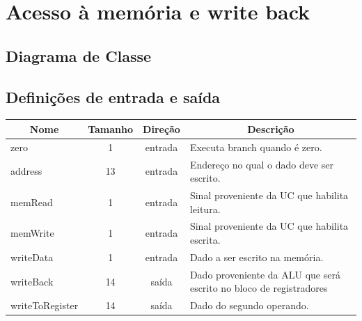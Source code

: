 \section{Acesso à memória e write back}
	\subsection{Diagrama de Classe}
  \begin{figure}[H]
    
  \end{figure}

\subsection{Definições de entrada e saída}

	\begin{center}
        \begin{longtable}[pos]{| l | c | c | m{7cm} |} \hline
          \multicolumn{1}{|c|}{\cellcolor[gray]{0.9}\textbf{Nome}} & 
          \multicolumn{1}{c|}{\cellcolor[gray]{0.9}\textbf{Tamanho}} & 
          \multicolumn{1}{c|}{\cellcolor[gray]{0.9}\textbf{Direção}} &
          \multicolumn{1}{c|}{\cellcolor[gray]{0.9}\textbf{Descrição}} \\ \hline
          \endhead
          \hline
          \endlastfoot

          zero          	       & 1   & entrada   & Executa branch quando é zero.    \\ \hline
          address                  & 13  & entrada   & Endereço no qual o dado deve ser escrito.    \\ \hline
          memRead                  & 1   & entrada   & Sinal proveniente da UC que habilita leitura.    \\ \hline
          memWrite                 & 1   & entrada   & Sinal proveniente da UC que habilita escrita.    \\ \hline
          writeData      		   & 1   & entrada   & Dado a ser escrito na memória. \\ \hline
          writeBack	               & 14  & saída     & Dado proveniente da ALU que será escrito no bloco de registradores\\ \hline
          writeToRegister          & 14  & saída     & Dado do segundo operando.    \\
        \end{longtable}
      \end{center}
      
